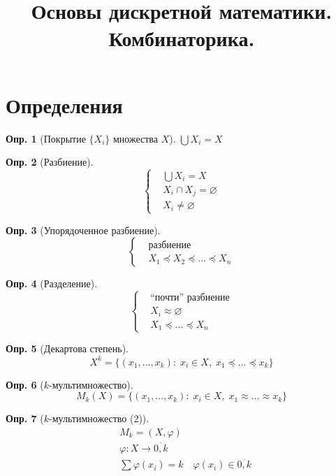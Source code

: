 \documentclass[a4paper,12pt]{article}
\title{Основы дискретной математики.\\Комбинаторика.}
\author{}
\date{}
\numberwithin{figure}{section}
\theoremstyle{definition}
\newtheorem{definition}{Опр.}[section]
\theoremstyle{definition}
\begin{document}
\maketitle



\section{Определения}


\begin{definition}[Покрытие $\{X_i\}$ множества $X$]
	$\bigcup{X_i} = X$
\end{definition}

\begin{definition}[Разбиение]
	\[\begin{cases}
		& \bigcup{X_i} = X \\
		& X_i \cap X_j = \varnothing \\
		& X_i \ne \varnothing
	\end{cases}\]
\end{definition}

\begin{definition}[Упорядоченное разбиение]  \label{def.ord.break}
	\[\begin{cases}
		& \text{разбиение} \\
		& X_1 \preccurlyeq X_2 \preccurlyeq ... \preccurlyeq X_n
	\end{cases}\]
\end{definition}

\begin{definition}[Разделение]  \label{def.division}
	\[ \begin{cases}
		& \text{``почти'' разбиение} \\
		& X_i \approx \varnothing \\
		& X_1 \preccurlyeq ... \preccurlyeq X_n
	\end{cases} \]
\end{definition}

\begin{definition}[Декартова степень]
	\[ X^k = \{(x_1,...,x_k): \; x_i \in X, \; x_1 \preccurlyeq ... \preccurlyeq x_k \} \]
\end{definition}

\begin{definition}[$k$-мультимножество]
	\[ M_k(X) = \{(x_1,...,x_k): \; x_i \in X, \; x_1 \approx ... \approx x_k \} \]
\end{definition}

\begin{definition}[$k$-мультимножество (2)]
	\begin{align*}
		& M_k = (X, \varphi) \\
		& \varphi: X \rightarrow \overline{0,k} \\
		& \sum{\varphi(x_i)} = k \quad \varphi(x_i) \in \overline{0,k}
	\end{align*}
\end{definition}
\end{document}
